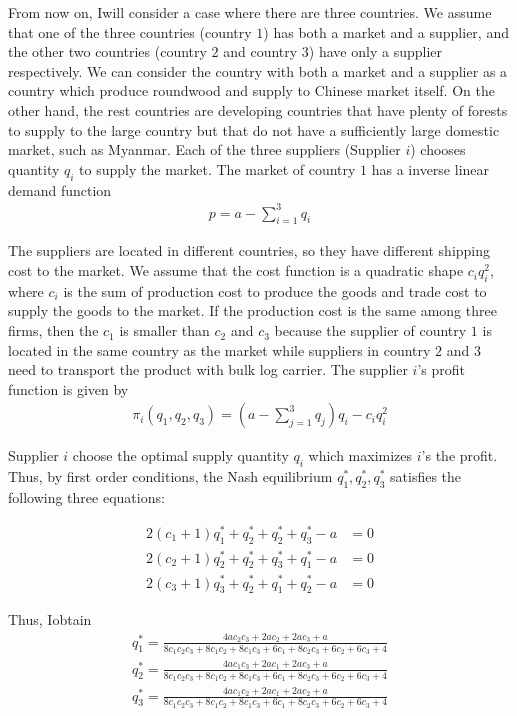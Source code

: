 \documentclass[a4paper,12pt]{article}
\begin{document}
From now on, Iwill consider a case where there are three countries. We assume that one of the three countries (country $1$) has both a market and a supplier, and the other two countries (country $2$ and country $3$) have only a supplier respectively. We can consider the country with both a market and a supplier as a country which produce roundwood and supply to Chinese market itself. On the other hand, the rest countries are developing countries that have plenty of forests to supply to the large country but that do not have a sufficiently large domestic market, such as Myanmar. Each of the three suppliers (Supplier $i$) chooses quantity $q_i$ to supply the market. The market of country $1$ has a inverse linear demand function
\begin{align}
    p = a - \sum_{i=1}^3 q_i
\end{align}

The suppliers are located in different countries, so they have different shipping cost to the market. We assume that the cost function is a quadratic shape $c_{i} q_i ^ 2$, where $c_i$ is the sum of production cost to produce the goods and trade cost to supply the goods to the market. If the production cost is the same among three firms, then the $c_1$ is smaller than $c_2$ and $c_3$ because the supplier of country $1$ is located in the same country as the market while suppliers in country $2$ and $3$ need to transport the product with bulk log carrier. The supplier $i$'s profit function is given by 
\begin{align}
    \pi_i (q_1, q_2, q_3) = \left( a - \sum_{j=1}^3 q_{j} \right) q_{i} - c_{i} q_i ^ 2 
\end{align}

Supplier $i$ choose the optimal supply quantity $q_i$ which maximizes $i$'s the profit. Thus, by first order conditions, the Nash equilibrium $q_1^*, q_2^*, q_3^*$ satisfies the following three equations:

\begin{align}
    2(c_1 + 1) q_1^* + q_2 ^* + q_2 ^ * + q_3 ^ * - a &= 0 \\
    2(c_2 + 1) q_2^* + q_2 ^* + q_3 ^ * + q_1 ^ * - a &= 0 \\
    2(c_3 + 1) q_3^* + q_2 ^* + q_1 ^ * + q_2 ^ * - a &= 0
\end{align}

Thus, Iobtain 
\begin{align}
    q_1^* = \frac{4 a c_{2} c_{3} + 2 a c_{2} + 2 a c_{3} + a}{8 c_{1} c_{2} c_{3} + 8 c_{1} c_{2} + 8 c_{1} c_{3} + 6 c_{1} + 8 c_{2} c_{3} + 6 c_{2} + 6 c_{3} + 4} \\
    q_2^* = \frac{4 a c_{1} c_{3} + 2 a c_{1} + 2 a c_{3} + a}{8 c_{1} c_{2} c_{3} + 8 c_{1} c_{2} + 8 c_{1} c_{3} + 6 c_{1} + 8 c_{2} c_{3} + 6 c_{2} + 6 c_{3} + 4} \\
    q_3^* = \frac{4 a c_{1} c_{2} + 2 a c_{1} + 2 a c_{2} + a}{8 c_{1} c_{2} c_{3} + 8 c_{1} c_{2} + 8 c_{1} c_{3} + 6 c_{1} + 8 c_{2} c_{3} + 6 c_{2} + 6 c_{3} + 4}
\end{align}
\end{document}
